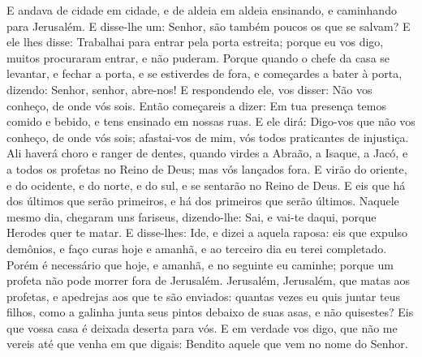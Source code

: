 {  E andava de cidade em cidade, e de aldeia em aldeia ensinando, e caminhando para Jerusalém.
  E disse-lhe um: Senhor, são também poucos os que se salvam? E ele lhes disse:
  Trabalhai para entrar pela porta estreita; porque eu vos digo,
{} muitos procuraram entrar, e não puderam.
  Porque quando o chefe da casa se levantar, e fechar a porta, e se estiverdes de fora, e começardes a bater à porta, dizendo: Senhor, senhor, abre-nos! E respondendo ele, vos disser: Não vos conheço,
{} de onde vós sois.
  Então começareis a dizer: Em tua presença temos comido e bebido, e tens ensinado em nossas ruas.
  E ele dirá: Digo-vos que não vos conheço,
{} de onde vós sois; afastai-vos de mim, vós todos praticantes de injustiça.
  Ali haverá choro e ranger de dentes, quando virdes a Abraão, a Isaque, a Jacó, e a todos os profetas no Reino de Deus; mas vós
{} lançados fora.
  E virão
{} do oriente, e do ocidente, e do norte, e do sul, e se sentarão
{} no Reino de Deus.
  E eis que há
{} dos últimos que serão primeiros, e há
{} dos primeiros que serão últimos.
  Naquele mesmo dia, chegaram uns fariseus, dizendo-lhe: Sai, e vai-te daqui, porque Herodes quer te matar.
  E disse-lhes: Ide, e dizei a aquela raposa: eis que expulso demônios, e faço curas hoje e amanhã, e ao terceiro dia eu terei completado.
  Porém é necessário que hoje, e amanhã, e no
{} seguinte eu caminhe; porque um profeta não pode morrer fora de Jerusalém.
  Jerusalém, Jerusalém, que matas aos profetas, e apedrejas aos que te são enviados: quantas vezes eu quis juntar teus filhos, como a galinha junta seus pintos debaixo de suas asas, e não quisestes?
  Eis que vossa casa é deixada deserta para vós. E em verdade vos digo, que não me vereis até que venha
{} em que digais: Bendito aquele que vem no nome do Senhor.
\par }

